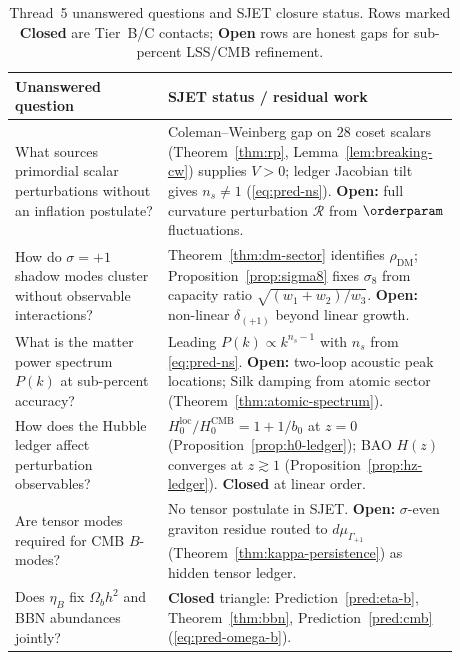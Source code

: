 \begin{table}[ht]
\centering
\small
\renewcommand{\arraystretch}{1.12}
\begin{tabular}{@{}p{0.30\linewidth}p{0.58\linewidth}@{}}
\toprule
\textbf{Unanswered question} & \textbf{SJET status / residual work} \\
\midrule
What sources primordial scalar perturbations without an inflation postulate? &
  Coleman--Weinberg gap on $28$ coset scalars
  (Theorem~\ref{thm:rp}, Lemma~\ref{lem:breaking-cw}) supplies $V>0$;
  ledger Jacobian tilt gives $n_s\neq 1$
  (\eqref{eq:pred-ns}). \textbf{Open:} full curvature perturbation
  $\mathcal{R}$ from $\orderparam$ fluctuations. \\
\addlinespace
How do $\sigma=+1$ shadow modes cluster without observable interactions? &
  Theorem~\ref{thm:dm-sector} identifies $\rho_{\mathrm{DM}}$;
  Proposition~\ref{prop:sigma8} fixes $\sigma_8$ from capacity ratio
  $\sqrt{(w_1+w_2)/w_3}$. \textbf{Open:} non-linear
  $\delta_{(+1)}$ beyond linear growth. \\
\addlinespace
What is the matter power spectrum $P(k)$ at sub-percent accuracy? &
  Leading $P(k)\propto k^{n_s-1}$ with $n_s$ from
  \eqref{eq:pred-ns}. \textbf{Open:} two-loop acoustic peak locations;
  Silk damping from atomic sector
  (Theorem~\ref{thm:atomic-spectrum}). \\
\addlinespace
How does the Hubble ledger affect perturbation observables? &
  $H_0^{\mathrm{loc}}/H_0^{\mathrm{CMB}}=1+1/b_0$ at $z=0$
  (Proposition~\ref{prop:h0-ledger}); BAO $H(z)$ converges at $z\gtrsim 1$
  (Proposition~\ref{prop:hz-ledger}). \textbf{Closed} at linear order. \\
\addlinespace
Are tensor modes required for CMB $B$-modes? &
  No tensor postulate in SJET. \textbf{Open:} $\sigma$-even graviton
  residue routed to $d\mu_{\Gamma_{+1}}$
  (Theorem~\ref{thm:kappa-persistence}) as hidden tensor ledger. \\
\addlinespace
Does $\eta_B$ fix $\Omega_b h^2$ and BBN abundances jointly? &
  \textbf{Closed} triangle: Prediction~\ref{pred:eta-b},
  Theorem~\ref{thm:bbn}, Prediction~\ref{pred:cmb}
  (\eqref{eq:pred-omega-b}). \\
\bottomrule
\end{tabular}
\caption{Thread~5 unanswered questions and SJET closure status. Rows marked
\textbf{Closed} are Tier~B/C contacts; \textbf{Open} rows are honest gaps
for sub-percent LSS/CMB refinement.}
\label{tab:thread5-questions}
\end{table}

